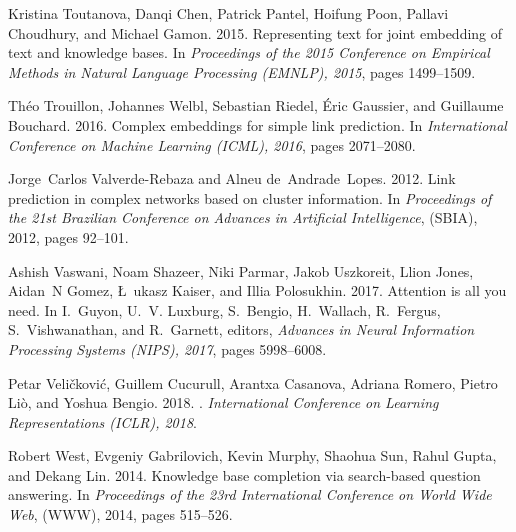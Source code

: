 \documentclass[11pt,a4paper]{article}
\begin{document}
\begin{thebibliography}{29}
Kristina Toutanova, Danqi Chen, Patrick Pantel, Hoifung Poon, Pallavi
  Choudhury, and Michael Gamon. 2015.
\newblock Representing text for joint embedding of text and knowledge bases.
\newblock In \emph{Proceedings of the 2015 Conference on Empirical Methods in
  Natural Language Processing (EMNLP), 2015}, pages 1499--1509.

Th{\'e}o Trouillon, Johannes Welbl, Sebastian Riedel, {\'E}ric Gaussier, and
  Guillaume Bouchard. 2016.
\newblock Complex embeddings for simple link prediction.
\newblock In \emph{International Conference on Machine Learning (ICML), 2016},
  pages 2071--2080.

Jorge~Carlos Valverde-Rebaza and Alneu de~Andrade~Lopes. 2012.
\newblock Link prediction in complex networks based on cluster information.
\newblock In \emph{Proceedings of the 21st Brazilian Conference on Advances in
  Artificial Intelligence}, (SBIA), 2012, pages 92--101.

Ashish Vaswani, Noam Shazeer, Niki Parmar, Jakob Uszkoreit, Llion Jones,
  Aidan~N Gomez, \L~ukasz Kaiser, and Illia Polosukhin. 2017.
\newblock Attention is all you need.
\newblock In I.~Guyon, U.~V. Luxburg, S.~Bengio, H.~Wallach, R.~Fergus,
  S.~Vishwanathan, and R.~Garnett, editors, \emph{Advances in Neural
  Information Processing Systems (NIPS), 2017}, pages 5998--6008.

Petar Veli{\v{c}}kovi{\'{c}}, Guillem Cucurull, Arantxa Casanova, Adriana
  Romero, Pietro Li{\`{o}}, and Yoshua Bengio. 2018.
.
\newblock \emph{International Conference on Learning Representations (ICLR),
  2018}.

Robert West, Evgeniy Gabrilovich, Kevin Murphy, Shaohua Sun, Rahul Gupta, and
  Dekang Lin. 2014.
\newblock Knowledge base completion via search-based question answering.
\newblock In \emph{Proceedings of the 23rd International Conference on World
  Wide Web}, (WWW), 2014, pages 515--526.


\end{thebibliography}
\end{document}

